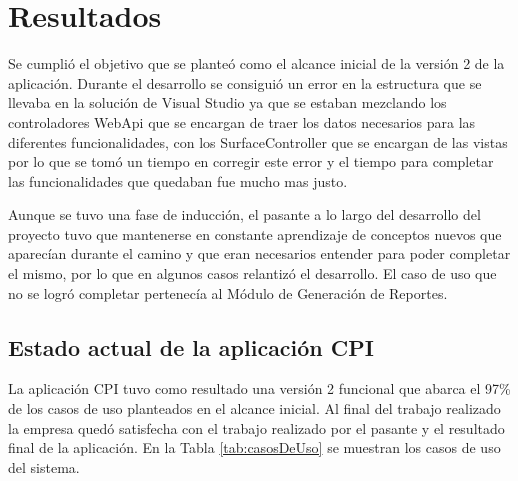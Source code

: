 \chapter{Resultados}
Se cumplió el objetivo que se planteó como el alcance inicial de la versión 2 de la aplicación. Durante el desarrollo se consiguió un error en la estructura que se llevaba en la solución de Visual Studio ya que se estaban mezclando los controladores WebApi que se encargan de traer los datos necesarios para las diferentes funcionalidades, con los SurfaceController que se encargan de las vistas por lo que se tomó un tiempo en corregir este error y el tiempo para completar las funcionalidades que quedaban fue mucho mas justo.

Aunque se tuvo una fase de inducción, el pasante a lo largo del desarrollo del proyecto tuvo que mantenerse en constante aprendizaje de conceptos nuevos que aparecían durante el camino y que eran necesarios entender para poder completar el mismo, por lo que en algunos casos relantizó el desarrollo. El caso de uso que no se logró completar pertenecía al Módulo de Generación de Reportes. 


\section{Estado actual de la aplicación CPI}
La aplicación CPI tuvo como resultado una versión 2 funcional que abarca el 97\% de los casos de uso planteados en el alcance inicial. Al final del trabajo realizado la empresa quedó satisfecha con el trabajo realizado por el pasante y el resultado final de la aplicación. En la Tabla \ref{tab:casosDeUso} se muestran los casos de uso del sistema.



